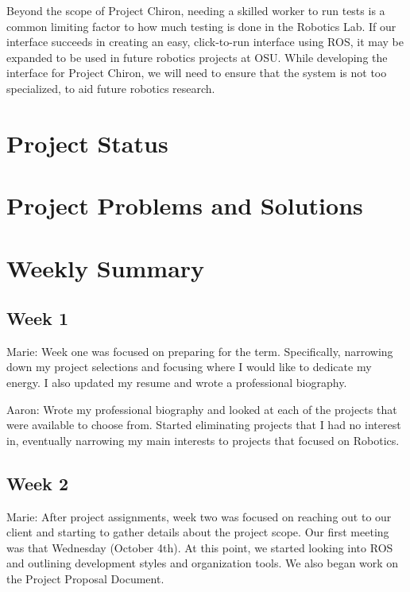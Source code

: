 \documentclass[onecolumn, draftclsnofoot,10pt, compsoc]{IEEEtran}
\begin{document}
Beyond the scope of Project Chiron, needing a skilled worker to run tests is a common limiting factor to how much testing is done in the Robotics Lab. If our interface succeeds in creating an easy, click-to-run interface using ROS, it may be expanded to be used in future robotics projects at OSU. While developing the interface for Project Chiron, we will need to ensure that the system is not too specialized, to aid future robotics research. 

\section{Project Status}

\section{Project Problems and Solutions}

\section{Weekly Summary}

\subsection{Week 1}
Marie: Week one was focused on preparing for the term. Specifically, narrowing down my project selections and focusing where I would like to dedicate my energy. I also updated my resume and wrote a professional biography.\par

Aaron: Wrote my professional biography and looked at each of the projects that were available to choose from. Started eliminating projects that I had no interest in, eventually narrowing my main interests to projects that focused on Robotics.\par

\subsection{Week 2}
Marie: After project assignments, week two was focused on reaching out to our client and starting to gather details about the project scope. Our first meeting was that Wednesday (October 4th). At this point, we started looking into ROS and outlining development styles and organization tools. We also began work on the Project Proposal Document.\par
\end{document}
